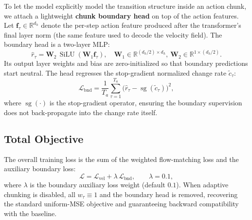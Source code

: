 To let the model explicitly model the transition structure inside an action chunk, we
attach a lightweight \textbf{chunk boundary head} on top of the action features. Let
$\mathbf{f}_\tau \in \mathbb{R}^{d_h}$ denote the per-step action feature produced after
the transformer's final layer norm (the same feature used to decode the velocity field).
The boundary head is a two-layer MLP:
%
\begin{equation}
  \hat{r}_\tau
  = \mathbf{W}_2\,\operatorname{SiLU}(\mathbf{W}_1 \mathbf{f}_\tau),
  \quad
  \mathbf{W}_1 \in \mathbb{R}^{(d_h/2) \times d_h},\
  \mathbf{W}_2 \in \mathbb{R}^{1 \times (d_h/2)}.
  \label{eq:boundary_head}
\end{equation}
%
Its output layer weights and bias are zero-initialized so that boundary predictions start
neutral. The head regresses the stop-gradient normalized change rate $\tilde{c}_\tau$:
%
\begin{equation}
  \mathcal{L}_{\text{bnd}}
  = \frac{1}{T_a}\sum_{\tau=1}^{T_a}
    \bigl(\hat{r}_\tau - \operatorname{sg}(\tilde{c}_\tau)\bigr)^2,
  \label{eq:boundary_loss}
\end{equation}
%
where $\operatorname{sg}(\cdot)$ is the stop-gradient operator, ensuring the boundary
supervision does not back-propagate into the change rate itself.

\subsection{Total Objective}

The overall training loss is the sum of the weighted flow-matching loss and the auxiliary
boundary loss:
%
\begin{equation}
  \mathcal{L}
  = \mathcal{L}_{\text{vel}} + \lambda\, \mathcal{L}_{\text{bnd}},
  \qquad \lambda = 0.1,
  \label{eq:total_loss}
\end{equation}
%
where $\lambda$ is the boundary auxiliary loss weight (default $0.1$). When adaptive
chunking is disabled, all $w_\tau \equiv 1$ and the boundary head is removed, recovering
the standard uniform-MSE objective and guaranteeing backward compatibility with the
baseline.
